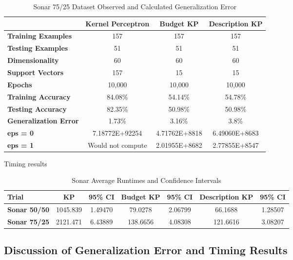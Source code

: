 \begin{table}[h!]
 \begin{center}
  \caption{Sonar 75/25 Dataset Observed and Calculated Generalization Error}
  \label{tab:sonar75gencalc}
  \begin{tabular}{l|c|c|c}
  \textbf{ } & \textbf{Kernel Perceptron} & \textbf{Budget KP} & \textbf{Description KP}\\
  \hline
  \textbf{Training Examples} & 157 & 157 & 157\\
  \textbf{Testing Examples} & 51 & 51 & 51\\
  \textbf{Dimensionality} & 60 & 60 & 60\\
  \textbf{Support Vectors} & 157 & 15 & 15\\
  \textbf{Epochs} & 10,000 & 10,000 & 10,000\\
  \hline
  \textbf{Training Accuracy} & 84.08\% & 54.14\% & 54.78\%\\
  \textbf{Testing Accuracy} & 82.35\% & 50.98\% & 50.98\%\\
  \textbf{Generalization Error} & 1.73\% & 3.16\% & 3.8\%\\
  \hline
  \textbf{eps = 0} & 7.18772E+92254 & 4.71762E+8818 & 6.49060E+8683\\
  \textbf{eps = 1} & Would not compute & 2.01955E+8682 & 2.77855E+8547\\
  \end{tabular}
 \end{center}
\end{table}

Timing results

\begin{table}[h!]
 \begin{center}
  \caption{Sonar Average Runtimes and Confidence Intervals}
  \label{tab:sonartabtiming}
  \begin{tabular}{l|c|c|c|c|c|c}
  \textbf{Trial} & \textbf{KP} & \textbf{95\% CI} & \textbf{Budget KP} & \textbf{95\% CI} & \textbf{Description KP} & \textbf{95\% CI}\\
  \hline
  \textbf{Sonar 50/50} & 1045.839 & 1.49470 & 79.0278 & 2.06799 & 66.1688 & 1.28507\\
  \textbf{Sonar 75/25} & 2121.471 & 6.43889 & 138.6656 & 4.08308 & 121.6616 & 3.08207\\
  \end{tabular}
 \end{center}
\end{table}

\subsection{Discussion of Generalization Error and Timing Results}\label{ResultsDiscussion}

